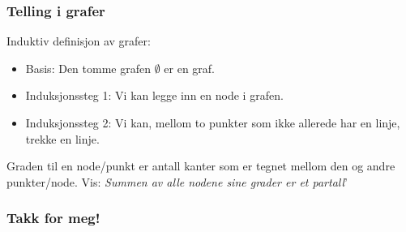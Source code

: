 \documentclass{beamer}
\begin{document}
\begin{frame}
\frametitle{Telling i grafer}
Induktiv definisjon av grafer:

\begin{itemize}
	\item Basis: Den tomme grafen $\emptyset$ er en graf.
	\item Induksjonssteg 1: Vi kan legge inn en node i grafen.
	\item Induksjonssteg 2: Vi kan, mellom to punkter som ikke allerede har en linje, trekke en linje.
\end{itemize}

Graden til en node/punkt er antall kanter som er tegnet mellom den og andre punkter/node.
\linebreak
Vis: \textit{Summen av alle nodene sine grader er et partall}'

\end{frame}

\begin{frame}
\frametitle{Takk for meg!}
\end{frame}
\end{document}
